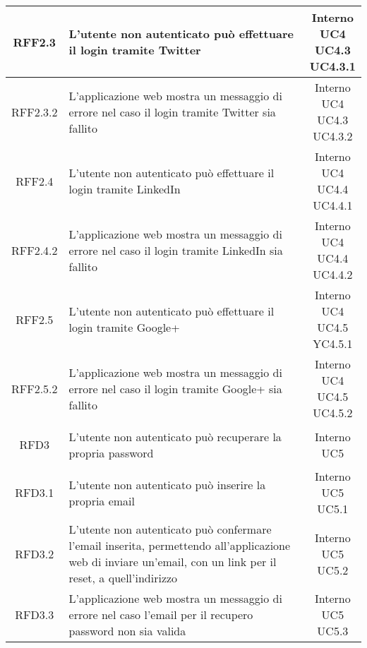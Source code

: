 \begin{longtable}{|c|p{8cm}|c|}
\hypertarget{RFF2.3}{RFF2.3} & L'utente non autenticato può effettuare il login tramite Twitter & \makecell*{Interno\\UC4\\UC4.3\\UC4.3.1} \\
\hline
\hypertarget{RFF2.3.2}{RFF2.3.2} & L'applicazione web mostra un messaggio di errore nel caso il login tramite Twitter sia fallito & \makecell*{Interno\\UC4\\UC4.3\\UC4.3.2} \\
\hline

\hypertarget{RFF2.4}{RFF2.4} & L'utente non autenticato può effettuare il login tramite LinkedIn & \makecell*{Interno\\UC4\\UC4.4\\UC4.4.1} \\
\hline
\hypertarget{RFF2.4.2}{RFF2.4.2} & L'applicazione web mostra un messaggio di errore nel caso il login tramite LinkedIn sia fallito & \makecell*{Interno\\UC4\\UC4.4\\UC4.4.2} \\
\hline

\hypertarget{RFF2.5}{RFF2.5} & L'utente non autenticato può effettuare il login tramite Google+ & \makecell*{Interno\\UC4\\UC4.5\\YC4.5.1} \\
\hline
\hypertarget{RFF2.5.2}{RFF2.5.2} & L'applicazione web mostra un messaggio di errore nel caso il login tramite Google+ sia fallito & \makecell*{Interno\\UC4\\UC4.5\\UC4.5.2} \\
\hline

\hypertarget{RFD3}{RFD3} & L'utente non autenticato può recuperare la propria password & \makecell*{Interno\\UC5} \\
\hline

\hypertarget{RFD3.1}{RFD3.1} & L'utente non autenticato può inserire la propria email & \makecell*{Interno\\UC5\\UC5.1} \\
\hline
\hypertarget{RFD3.2}{RFD3.2} & L'utente non autenticato può confermare l'email inserita, permettendo all'applicazione web di inviare un'email, con un link per il reset, a quell'indirizzo & \makecell*{Interno\\UC5\\UC5.2} \\
\hline
\hypertarget{RFD3.3}{RFD3.3} & L'applicazione web mostra un messaggio di errore nel caso l'email per il recupero password non sia valida & \makecell*{Interno\\UC5\\UC5.3} \\
\hline


\end{longtable}
